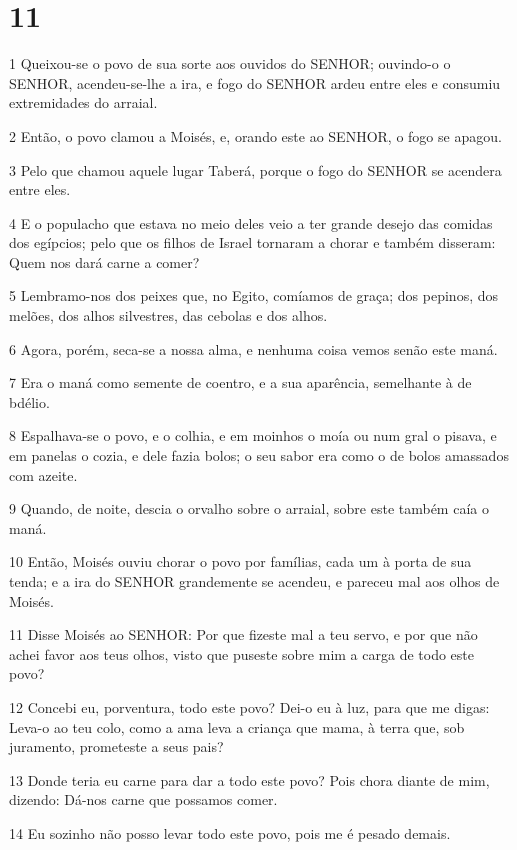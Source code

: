 \chapter{11}

\par 1 Queixou-se o povo de sua sorte aos ouvidos do SENHOR; ouvindo-o o SENHOR, acendeu-se-lhe a ira, e fogo do SENHOR ardeu entre eles e consumiu extremidades do arraial.
\par 2 Então, o povo clamou a Moisés, e, orando este ao SENHOR, o fogo se apagou.
\par 3 Pelo que chamou aquele lugar Taberá, porque o fogo do SENHOR se acendera entre eles.
\par 4 E o populacho que estava no meio deles veio a ter grande desejo das comidas dos egípcios; pelo que os filhos de Israel tornaram a chorar e também disseram: Quem nos dará carne a comer?
\par 5 Lembramo-nos dos peixes que, no Egito, comíamos de graça; dos pepinos, dos melões, dos alhos silvestres, das cebolas e dos alhos.
\par 6 Agora, porém, seca-se a nossa alma, e nenhuma coisa vemos senão este maná.
\par 7 Era o maná como semente de coentro, e a sua aparência, semelhante à de bdélio.
\par 8 Espalhava-se o povo, e o colhia, e em moinhos o moía ou num gral o pisava, e em panelas o cozia, e dele fazia bolos; o seu sabor era como o de bolos amassados com azeite.
\par 9 Quando, de noite, descia o orvalho sobre o arraial, sobre este também caía o maná.
\par 10 Então, Moisés ouviu chorar o povo por famílias, cada um à porta de sua tenda; e a ira do SENHOR grandemente se acendeu, e pareceu mal aos olhos de Moisés.
\par 11 Disse Moisés ao SENHOR: Por que fizeste mal a teu servo, e por que não achei favor aos teus olhos, visto que puseste sobre mim a carga de todo este povo?
\par 12 Concebi eu, porventura, todo este povo? Dei-o eu à luz, para que me digas: Leva-o ao teu colo, como a ama leva a criança que mama, à terra que, sob juramento, prometeste a seus pais?
\par 13 Donde teria eu carne para dar a todo este povo? Pois chora diante de mim, dizendo: Dá-nos carne que possamos comer.
\par 14 Eu sozinho não posso levar todo este povo, pois me é pesado demais.
